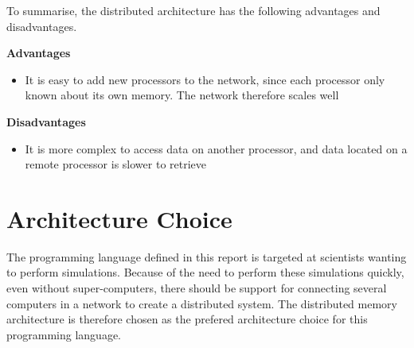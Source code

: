 To summarise, the distributed architecture has the following advantages and disadvantages.

\noindent\textbf{Advantages}
\begin{itemize}
    \item It is easy to add new processors to the network, since each processor only known about its own memory. The network therefore scales well
\end{itemize}

\noindent\textbf{Disadvantages}
\begin{itemize}
    \item It is more complex to access data on another processor, and data located on a remote processor is slower to retrieve
\end{itemize}

\section{Architecture Choice}

The programming language defined in this report is targeted at scientists wanting to perform simulations. Because of the need to perform these simulations quickly, even without super-computers, there should be support for connecting several computers in a network to create a distributed system. The distributed memory architecture is therefore chosen as the prefered architecture choice for this programming language.
